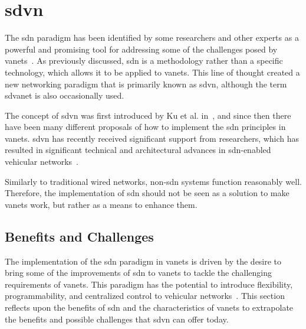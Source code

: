 
%

\chapter[Software Defined Vehicular Network]{\gls{sdvn}}
\label{cha:sdvn}

The \gls{sdn} paradigm has been identified by some researchers and other experts as a powerful and promising tool for addressing some of the challenges posed by \glspl{vanet}~\cite{smida_efficient_2020}. As previously discussed, \gls{sdn} is a methodology rather than a specific technology, which allows it to be applied to \glspl{vanet}. This line of thought created a new networking paradigm that is primarily known as \gls{sdvn}, although the term \gls{sdvanet} is also occasionally used.

The concept of \gls{sdvn} was first introduced by Ku et al. in~\cite{ku_towards_2014}, and since then there have been many different proposals of how to implement the \gls{sdn} principles in \glspl{vanet}. \gls{sdvn} has recently received significant support from researchers, which has resulted in significant technical and architectural advances in \gls{sdn}-enabled vehicular networks~\cite{bhatia_software_2019}. 

Similarly to traditional wired networks, non-\gls{sdn} systems function reasonably well. Therefore, the implementation of \gls{sdn} should not be seen as a solution to make \glspl{vanet} work, but rather as a means to enhance them.

\section{Benefits and Challenges}

The implementation of the \gls{sdn} paradigm in \glspl{vanet} is driven by the desire to bring some of the improvements of \gls{sdn} to \glspl{vanet} to tackle the challenging requirements of \glspl{vanet}. This paradigm has the potential to introduce flexibility, programmability, and centralized control to vehicular networks~\cite{bhatia_software_2019}. This section reflects upon the benefits of \gls{sdn} and the characteristics of \glspl{vanet} to extrapolate the benefits and possible challenges that \gls{sdvn} can offer today.

